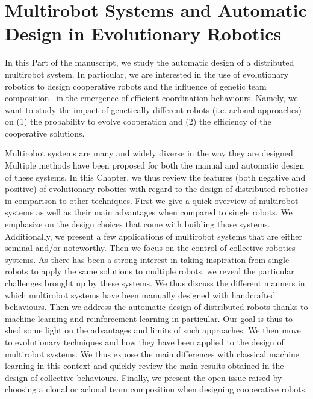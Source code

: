 \chapter{Multirobot Systems and Automatic Design in Evolutionary Robotics}
\label{chapter:design}


\setcounter{secnumdepth}{2}
\setcounter{minitocdepth}{2}
\minitoc[n] %

In this Part of the manuscript, we study the automatic design of a distributed multirobot system. In particular, we are interested in the use of evolutionary robotics to design cooperative robots and the influence of genetic team composition~\parencite{Waibel2009} in the emergence of efficient coordination behaviours. Namely, we want to study the impact of genetically different robots (i.e. aclonal approaches)~\parencite{Quinn2001} on (1) the probability to evolve cooperation and (2) the efficiency of the cooperative solutions.


Multirobot systems are many and widely diverse in the way they are designed. Multiple methods have been proposed for both the manual and automatic design of these systems. In this Chapter, we thus review the features (both negative and positive) of evolutionary robotics with regard to the design of distributed robotics in comparison to other techniques. First we give a quick overview of multirobot systems as well as their main advantages when compared to single robots. We emphasize on the design choices that come with building those systems. Additionally, we present a few applications of multirobot systems that are either seminal and/or noteworthy. Then we focus on the control of collective robotics systems. As there has been a strong interest in taking inspiration from single robots to apply the same solutions to multiple robots, we reveal the particular challenges brought up by these systems. We thus discuss the different manners in which multirobot systems have been manually designed with handcrafted behaviours. Then we address the automatic design of distributed robots thanks to machine learning and reinforcement learning in particular. Our goal is thus to shed some light on the advantages and limits of such approaches. We then move to evolutionary techniques and how they have been applied to the design of multirobot systems. We thus expose the main differences with classical machine learning in this context and quickly review the main results obtained in the design of collective behaviours. Finally, we present the open issue raised by choosing a clonal or aclonal team composition when designing cooperative robots.


